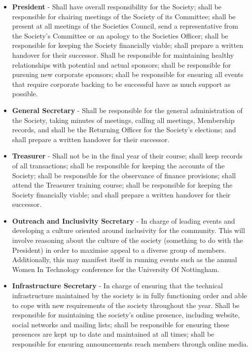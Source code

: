 \documentclass[a4paper,twoside,notitlepage,11pt]{article}
\begin{document}
\begin{itemize}
	\item \textbf{President} - Shall have overall responsibility for the Society; shall be responsible for chairing meetings of the Society of its Committee; shall be present at all meetings of the Societies Council, send a representative from the Society's Committee or an apology to the Societies Officer; shall be responsible for keeping the Society financially viable; shall prepare a written handover for their successor. Shall be responsible for maintaining healthy relationships with potential and actual sponsors; shall be responsible for pursuing new corporate sponsors; shall be responsible for ensuring all events that require corporate backing to be successful have as much support as possible.
	\item \textbf{General Secretary} - Shall be responsible for the general administration of the Society, taking minutes of meetings, calling all meetings, Membership records, and shall be the Returning Officer for the Society's elections; and shall prepare a written handover for their successor. 
	\item \textbf{Treasurer} - Shall not be in the final year of their course; shall keep records of all transactions; shall be responsible for keeping the accounts of the Society; shall be responsible for the observance of finance provisions; shall attend the Treasurer training course; shall be responsible for keeping the Society financially viable; and shall prepare a written handover for their successor.
	\item \textbf{Outreach and Inclusivity Secretary} - In charge of leading events and developing a culture oriented around inclusivity for the community. This will involve reasoning about the culture of the society (something to do with the President) in order to maximise appeal to a diverse group of members. Additionally, this may manifest itself in running events such as the annual Women In Technology conference for the University Of Nottingham.
	\item \textbf{Infrastructure Secretary} - In charge of ensuring that the technical infrastructure maintained by the society is in fully functioning order and able to cope with new requirements of the society throughout the year. Shall be responsible for maintaining the society's online presence, including website, social networks and mailing lists; shall be responsible for ensuring these presences are kept up to date and maintained at all times; shall be responsible for ensuring announcements reach members through online media.

\end{itemize}
\end{document}
